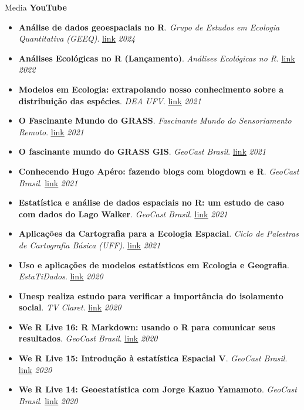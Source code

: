 \documentclass{resume}
\begin{document}
\begin{rSection}{Media}
{\bf YouTube}
\begin{itemize} 
\item {\bf Análise de dados geoespaciais no R}. {\it Grupo de Estudos em Ecologia Quantitativa (GEEQ)}. \href{https://youtu.be/qySBvCu7IS0}{\underline{link}} \hfill{\em 2024}	
\item {\bf Análises Ecológicas no R (Lançamento)}. {\it Análises Ecológicas no R}. \href{https://youtu.be/jYrneB95nes}{\underline{link}} \hfill{\em 2022}
\item {\bf Modelos em Ecologia: extrapolando nosso conhecimento sobre a distribuição das espécies}. {\it DEA UFV}. \href{https://youtu.be/Kcc-eIhqtlE}{\underline{link}} \hfill{\em 2021}
\item {\bf O Fascinante Mundo do GRASS}. {\it Fascinante Mundo do Sensoriamento Remoto}. \href{https://youtu.be/vp6frd89y9E}{\underline{link}} \hfill{\em 2021}
\item {\bf O fascinante mundo do GRASS GIS}. {\it GeoCast Brasil}. \href{https://youtu.be/_pohWjE4eiA}{\underline{link}} \hfill{\em 2021}
\item {\bf Conhecendo Hugo Apéro: fazendo blogs com blogdown e R}. {\it GeoCast Brasil}. \href{https://youtu.be/4Ixl2RjZEYI}{\underline{link}} \hfill{\em 2021}
\item {\bf Estatística e análise de dados espaciais no R: um estudo de caso com dados do Lago Walker}. {\it GeoCast Brasil}. \href{https://youtu.be/csh1BPH_H8I}{\underline{link}} \hfill{\em 2021}
\item {\bf Aplicações da Cartografia para a Ecologia Espacial}. {\it 
Ciclo de Palestras de Cartografia Básica (UFF)}. \href{https://youtu.be/csh1BPH_H8I}{\underline{link}} \hfill{\em 2021}
\item {\bf Uso e aplicações de modelos estatísticos em Ecologia e Geografia}. {\it EstaTiDados}. \href{https://youtu.be/pUavO7dVRGk}{\underline{link}} \hfill{\em 2020}
\item {\bf Unesp realiza estudo para verificar a importância do isolamento social}. {\it 
TV Claret}. \href{https://youtu.be/RP6rUQpberE}{\underline{link}} \hfill{\em 2020}
\item {\bf We R Live 16: R Markdown: usando o R para comunicar seus resultados}. {\it GeoCast Brasil}. \href{https://youtu.be/6oPZ5sGt6LA}{\underline{link}} \hfill{\em 2020}
\item {\bf We R Live 15: Introdução à estatística Espacial V}. {\it GeoCast Brasil}. \href{https://youtu.be/IeGTr7mjZIc}{\underline{link}} \hfill{\em 2020}
\item {\bf We R Live 14: Geoestatística com Jorge Kazuo Yamamoto}. {\it GeoCast Brasil}. \href{https://youtu.be/BvURukaIDM0}{\underline{link}} \hfill{\em 2020}

\end{itemize}
\end{rSection}
\end{document}
